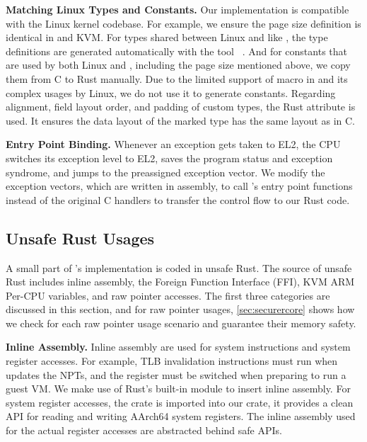 \textbf{Matching Linux Types and Constants.}
Our implementation is compatible with the Linux kernel codebase. For example,
we ensure the page size definition is identical in \rustcore{} and KVM.
For types shared between Linux and \rustcore{} like , the type
definitions are generated automatically with the tool
~\cite{bindgen}. And for constants that are used by both Linux
and \rustcore{}, including the page size mentioned above, we copy them from C
to Rust manually. Due to the limited support of macro in  and its
complex usages by Linux, we do not use it to generate constants.
Regarding alignment, field layout order, and padding of custom types, the Rust
attribute \code{\#[repr\-(C)]} is used. It ensures the data layout of the
marked type has the same layout as in C.

\textbf{Entry Point Binding.}
Whenever an exception gets taken to EL2, the CPU switches its exception level
to EL2, saves the program status and exception syndrome, and jumps to the
preassigned exception vector.
We modify the exception vectors, which are written in assembly, to call
\rustcore{}'s entry point functions instead of the original C handlers to
transfer the control flow to our Rust code.

\subsection{Unsafe Rust Usages}

A small part of \rustcore{}'s implementation is coded in unsafe Rust.
The source of unsafe Rust includes inline assembly, the Foreign Function
Interface (FFI), KVM ARM Per-CPU variables, and raw pointer accesses.
The first three categories are discussed in this section,
and for raw pointer usages, \autoref{sec:securercore} shows how we check for
each raw pointer usage scenario and guarantee their memory safety.

\textbf{Inline Assembly.}
Inline assembly are used for system instructions and system register accesses.
For example, TLB invalidation instructions must run when \rustcore{} updates the
NPTs, and the  register must be switched when preparing to run
a guest VM.
We make use of Rust's built-in module  to insert inline
assembly. For system register accesses, the  crate
\cite{aarch64cpu} is imported into our \rustcore{} crate, it provides a clean
API for reading and writing AArch64 system registers. The inline assembly used
for the actual register accesses are abstracted behind safe APIs.


